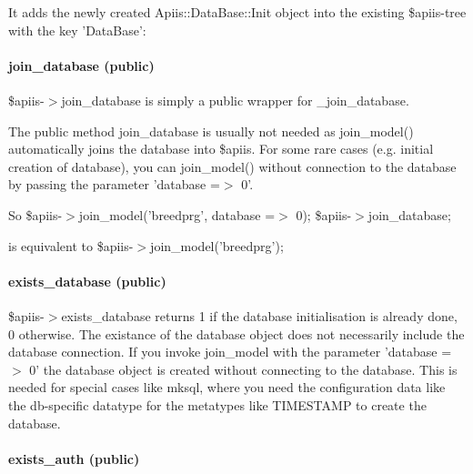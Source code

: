 It adds the newly created Apiis::DataBase::Init object into the existing
\$apiis-tree with the key 'DataBase':

\paragraph*{join\_database (public)\label{Apiis::Init_--_Basic_initialisation_object_for_the_complete_APIIS_structure_join_database_public_}}


\$apiis-$>$join\_database is simply a public wrapper for \_join\_database.



The public method join\_database is usually not needed as join\_model()
automatically joins the database into \$apiis. For some rare cases (e.g.
initial creation of database), you can join\_model() without connection to
the database by passing the parameter 'database =$>$ 0'.



So
   \$apiis-$>$join\_model('breedprg', database =$>$ 0);
   \$apiis-$>$join\_database;



is equivalent to
   \$apiis-$>$join\_model('breedprg');

\paragraph*{exists\_database (public)\label{Apiis::Init_--_Basic_initialisation_object_for_the_complete_APIIS_structure_exists_database_public_}}


\$apiis-$>$exists\_database returns 1 if the database initialisation is already
done, 0 otherwise. The existance of the database object does not
necessarily include the database connection. If you invoke join\_model with
the parameter 'database =$>$ 0' the database object is created without
connecting to the database. This is needed for special cases like mksql,
where you need the configuration data like the db-specific datatype for the
metatypes like TIMESTAMP to create the database.

\paragraph*{exists\_auth (public)\label{Apiis::Init_--_Basic_initialisation_object_for_the_complete_APIIS_structure_exists_auth_public_}}


